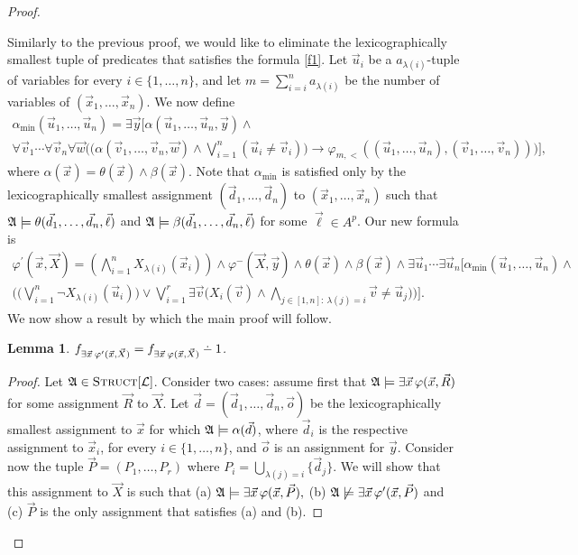 \documentclass[12pt]{article}
\def\dotminus{\mathbin{\ooalign{\hss\raise1ex\hbox{.}\hss\cr
  \mathsurround=0pt$-$}}}
\def\Truc{\textsc{Struct}[\L]}
\def\A{{\frak A}}
\def\L{{\cal L}}
\def\P{\vec{P}}
\def\R{\vec{R}}
\def\X{\vec{X}}
\def\d{\vec{d}} %
\def\l{\vec{\ell}}
\def\u{\vec{u}} %
\def\v{\vec{v}} %
\def\w{\vec{w}} %
\def\x{\vec{x}} %
\def\y{\vec{y}} %
\def\ep{\vec{o}}
\newtheorem{lemma}[theo]{Lemma}
\begin{document}
\begin{proof}
\begin{enumerate}
Similarly to the previous proof, we would like to eliminate the lexicographically smallest tuple of predicates that satisfies the formula \eqref{f1}. Let $\u_i$ be a $a_{\lambda(i)}$-tuple of variables for every $i \in \{1,\dots,n\}$, and let $m = \sum_{i = i}^n a_{\lambda(i)}$ be the number of variables of $(\x_1,\dots,\x_n)$. We now define
\begin{multline*}
\alpha_{\min}(\u_1,\dots,\u_n) = \exists\y\Big[ \alpha(\u_1,\dots,\u_n,\y)\wedge \\ \forall\v_1\cdots\forall\v_n\forall\w\Big(\big(\alpha(\v_1,\dots,\v_n,\w)\wedge\bigvee_{i=1}^n(\u_i\neq\v_i)\big)\to \varphi_{m,<}((\u_1,\dots,\u_n),(\v_1,\dots,\v_n))\Big)\Big],
\end{multline*}
where $\alpha(\x) = \theta(\x) \wedge \beta(\x)$. Note that $\alpha_{\min}$ is satisfied only by the lexicographically \linebreak smallest assignment $(\d_1,\dots,\d_n)$ to $(\x_1,\dots,\x_n)$ such that $\A\models\theta(\d_1,\dots,\d_n,\l)$ and $\A\models\beta(\d_1,\dots,\d_n,\l)$ for some $\l \in A^p$. Our new formula is
\begin{multline}
\varphi^\prime(\x,\X) = \left( \bigwedge_{i=1}^n X_{\lambda(i)}(\x_i) \right) \wedge \varphi^{-}(\X,\y) \wedge \theta(\x) \wedge \beta(\x)\wedge\exists\u_1\cdots\exists\u_n\bigg[\alpha_{\min}(\u_1,\dots,\u_n) \wedge \\ \bigg(\bigg(\bigvee_{i = 1}^{n}\neg X_{\lambda(i)}(\u_i) \bigg) \vee \bigvee_{i=1}^r \exists \v\Big( X_i(\v) \wedge \bigwedge_{j\in[1,n]:\: \lambda(j) = i} \v \neq \u_j\Big) \bigg) \bigg] \label{f2}.
\end{multline}
We now show a result by which the main proof will follow.
\begin{lemma}  \label{lemmaone}
$f_{\exists \x \: \varphi^\prime(\x,\X)} = f_{\exists \x \: \varphi(\x,\X)} \dotminus 1$.
\end{lemma}
\begin{proof}
Let $\A \in \Truc$. Consider two cases: assume first that $\A\models\exists\x\,\varphi(\x,\R)$ for some assignment $\R$ to $\X$. Let $\d = (\d_1,\dots,\d_n,\ep)$ be the lexicographically smallest assignment to $\x$ for which $\A\models\alpha(\d)$, where $\d_i$ is the respective assignment to $\x_i$, for every $i\in\{1,\dots,n\}$, and $\ep$ is an assignment for $\y$. Consider now the tuple $\P = (P_1,\dots,P_r)$ where $P_i = \bigcup_{\lambda(j)=i}\{\d_j\}$. We will show that this assignment to $\X$ is such that (a) $\A\models\exists\x\,\varphi(\x,\P),$ (b) $\A\not\models\exists\x\,\varphi^\prime(\x,\P)$ and (c) $\P$ is the only assignment that satisfies (a) and (b).

\end{proof}
\end{enumerate}
\end{proof}
\end{document}
